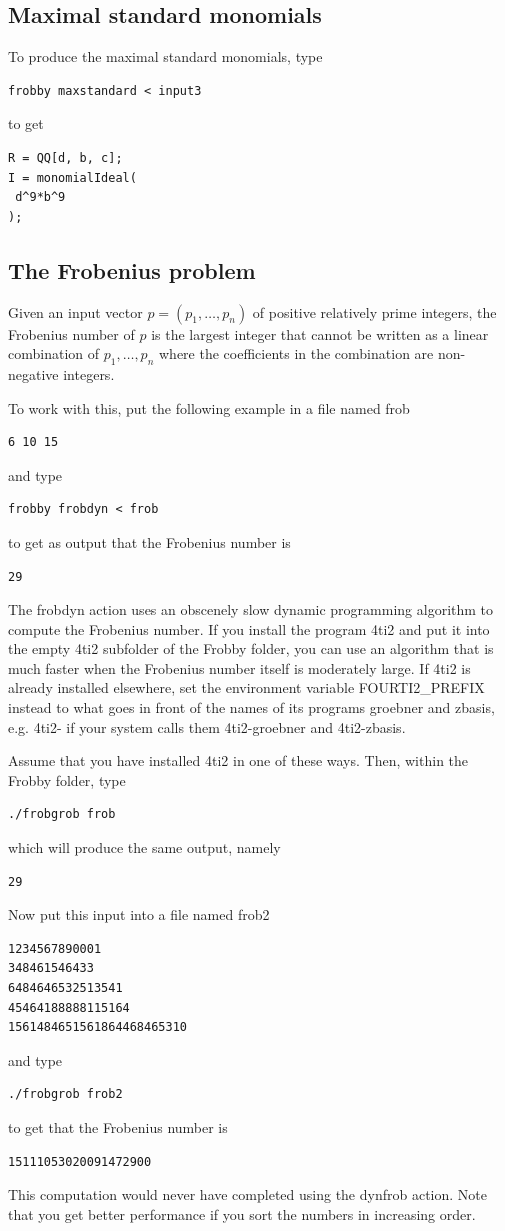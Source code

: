 \documentclass{amsart}
\theoremstyle{definition}
\begin{document}
\subsection{Maximal standard monomials}

To produce the maximal standard monomials, type
\begin{verbatim}
frobby maxstandard < input3
\end{verbatim}
to get
\begin{verbatim}
R = QQ[d, b, c];
I = monomialIdeal(
 d^9*b^9
);
\end{verbatim}

\subsection{The Frobenius problem}

Given an input vector $p=(p_1,\ldots,p_n)$ of positive relatively
prime integers, the Frobenius number of $p$ is the largest integer
that cannot be written as a linear combination of $p_1,\ldots,p_n$
where the coefficients in the combination are non-negative integers.

To work with this, put the following example in a file named frob
\begin{verbatim}
6 10 15
\end{verbatim}
and type
\begin{verbatim}
frobby frobdyn < frob
\end{verbatim}
to get as output that the Frobenius number is
\begin{verbatim}
29
\end{verbatim}
The frobdyn action uses an obscenely slow dynamic programming
algorithm to compute the Frobenius number. If you install the program
4ti2 and put it into the empty 4ti2 subfolder of the Frobby folder,
you can use an algorithm that is much faster when the Frobenius number
itself is moderately large. If 4ti2 is already installed elsewhere,
set the environment variable FOURTI2\_PREFIX instead to what goes in
front of the names of its programs groebner and zbasis, e.g. 4ti2- if
your system calls them 4ti2-groebner and 4ti2-zbasis.

Assume that you have installed 4ti2 in one of these ways. Then, within
the Frobby folder, type
\begin{verbatim}
./frobgrob frob
\end{verbatim}
which will produce the same output, namely
\begin{verbatim}
29
\end{verbatim}
Now put this input into a file named frob2
\begin{verbatim}
1234567890001
348461546433
6484646532513541
45464188888115164
1561484651561864468465310
\end{verbatim}
and type
\begin{verbatim}
./frobgrob frob2
\end{verbatim}
to get that the Frobenius number is
\begin{verbatim}
15111053020091472900
\end{verbatim}
This computation would never have completed using the dynfrob
action. Note that you get better performance if you sort the numbers
in increasing order.
\end{document}
